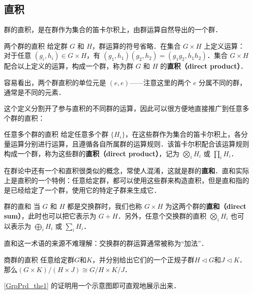 
\subsection{直积}

群的直积，是在群作为集合的笛卡尔积上，由群运算自然导出的一个群．

\begin{definition}{两个群的直积}
给定群 $G$ 和 $H$，群运算的符号省略．在集合 $G\times H$ 上定义运算：对于任意 $(g_i, h_i)\in G\times H$，有 $(g_1, h_1)(g_2, h_2)=(g_1g_2, h_1h_2)$．集合 $G\times H$ 配合以上定义的运算，构成一个群，称为群 $G$ 和 $H$ 的\textbf{直积（direct product）}．
\end{definition}

容易看出，两个群直积的单位元是 $(e, e)$——注意这里的两个 $e$ 分属不同的群，通常是不同的元素．

这个定义分割开了参与直积的不同群的运算，因此可以很方便地直接推广到任意多个群的直积：

\begin{definition}{任意多个群的直积}
给定任意多个群 $\{H_i\}$，在这些群作为集合的笛卡尔积上，各分量运算分别进行运算，且遵循各自所属群的运算规则．该笛卡尔积配合该运算规则构成一个群，称为这些群的\textbf{直积（direct product）}，记为 $\bigotimes_iH_i$ 或 $\prod_iH_i$．
\end{definition}

在群论中还有一个和直积很类似的概念，常使人混淆，这就是群的\textbf{直和}．直和实际上是直积的一个特例：任意给定群，都可以使用这些群来构造直积，但是直和指的是已经给定了一个群，使用它的特定子群来生成它．

\begin{definition}{群的直和}
当 $G$ 和 $H$ 都是交换群时，我们也称 $G\times H$ 为这两个群的\textbf{直和（direct sum）}，此时也可以把它表示为 $G+H$．另外，任意个交换群的直积 $\bigotimes_iH_i$ 也可以表示为 $\bigoplus_iH_i$ 或 $\sum_iH_i$．
\end{definition}

直和这一术语的来源不难理解：交换群的群运算通常被称为“加法”．

\begin{theorem}{商群的直积}\label{GrpPrd_the1}
任意给定群$G$和$K$，并分别给出它们的一个正规子群$H\triangleleft G$和$J\triangleleft K$．那么$(G\times K)/(H\times J)\cong G/H\times K/J$．
\end{theorem}

\autoref{GrpPrd_the1} 的证明用一个示意图即可直观地展示出来．

